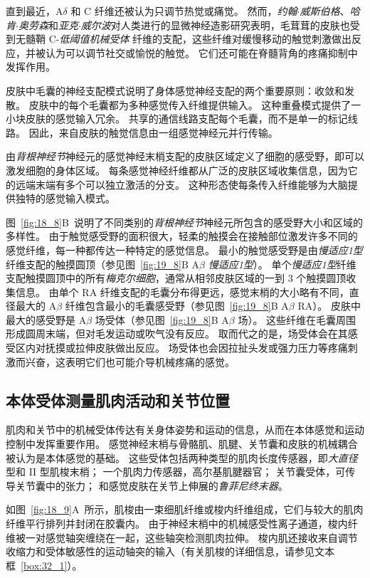 直到最近，A$\delta$ 和 C 纤维还被认为只调节热觉或痛觉。
然而，\textit{约翰$\cdot$威斯伯格}、\textit{哈肯$\cdot$奥劳森}和\textit{亚克$\cdot$威尔波}对人类进行的显微神经造影研究表明，毛茸茸的皮肤也受到无髓鞘 C-\textit{低阈值机械受体} 纤维的支配，这些纤维对缓慢移动的触觉刺激做出反应，并被认为可以调节社交或愉悦的触觉。
它们还可能在脊髓背角的疼痛抑制中发挥作用。


皮肤中毛囊的神经支配模式说明了身体感觉神经支配的两个重要原则：收敛和发散。
皮肤中的每个毛囊都为多种感觉传入纤维提供输入。
这种重叠模式提供了一小块皮肤的感觉输入冗余。
共享的通信线路支配每个毛囊，而不是单一的标记线路。 
因此，来自皮肤的触觉信息由一组感觉神经元并行传输。


由\textit{背根神经节}神经元的感觉神经末梢支配的皮肤区域定义了细胞的感受野，即可以激发细胞的身体区域。
每条感觉神经纤维都从广泛的皮肤区域收集信息，因为它的远端末端有多个可以独立激活的分支。
这种形态使每条传入纤维能够为大脑提供独特的感觉输入模式。


图~\ref{fig:18_8}B~说明了不同类别的\textit{背根神经节}神经元所包含的感受野大小和区域的多样性。
由于触觉感受野的面积很大，轻柔的触摸会在接触部位激发许多不同的感觉纤维，每一种都传达一种特定的感觉信息。
最小的触觉感受野是由\textit{慢适应1型}纤维支配的触摸圆顶（参见图~\ref{fig:19_8}B A$\beta$ \textit{慢适应1型}）。
单个\textit{慢适应1型}纤维支配触摸圆顶中的所有\textit{梅克尔细胞}，通常从相邻皮肤区域的一到 3 个触摸圆顶收集信息。
由单个 RA 纤维支配的毛囊分布得更远，感觉末梢的大小略有不同，直径最大的 A$\beta$ 纤维包含最小的毛囊感受野（参见图~\ref{fig:19_8}B A$\beta$ RA）。
皮肤中最大的感受野是 A$\beta$ 场受体（参见图~\ref{fig:19_8}B A$\beta$ 场）。
这些纤维在毛囊周围形成圆周末端，但对毛发运动或吹气没有反应。
取而代之的是，场受体会在其感受区内对抚摸或拉伸皮肤做出反应。
场受体也会因拉扯头发或强力压力等疼痛刺激而兴奋，这表明它们也可能介导机械疼痛的感觉。



\subsection{本体受体测量肌肉活动和关节位置}

肌肉和关节中的机械受体传达有关身体姿势和运动的信息，从而在本体感觉和运动控制中发挥重要作用。
感觉神经末梢与骨骼肌、肌腱、关节囊和皮肤的机械耦合被认为是本体感觉的基础。
这些受体包括两种类型的肌肉长度传感器，即\textit{大直径}型和 II 型肌梭末梢；
一个肌肉力传感器，高尔基肌腱器官；
关节囊受体，可传导关节囊中的张力；
和感觉皮肤在关节上伸展的\textit{鲁菲尼终末器}。


如图~\ref{fig:18_9}A~所示，肌梭由一束细肌纤维或梭内纤维组成，它们与较大的肌肉纤维平行排列并封闭在胶囊内。
由于神经末梢中的机械感受性离子通道，梭内纤维被一对感觉轴突缠绕在一起，这些轴突检测肌肉拉伸。
梭内肌还接收来自调节收缩力和受体敏感性的运动轴突的输入（有关肌梭的详细信息，请参见文本框~\ref{box:32_1}）。


